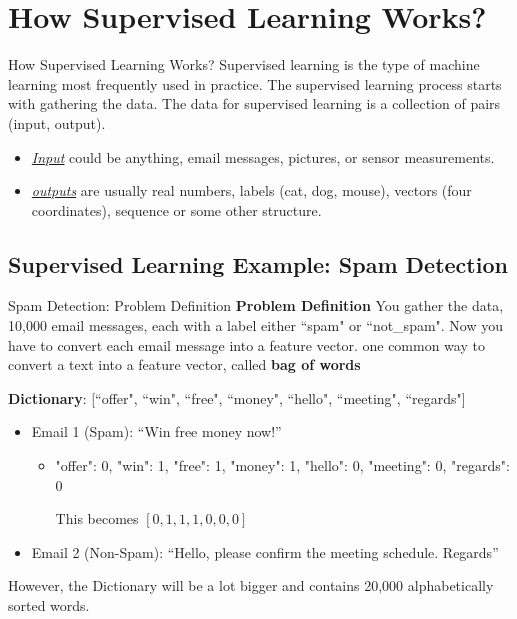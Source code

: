 \documentclass[10pt,dvipsnames]{beamer}
\newcommand{\cb}[1]{{\color{CadetBlue}#1}}
\begin{document}
\section{How Supervised Learning Works?}
\begin{frame}{How Supervised Learning Works?}
    Supervised learning is the type of machine learning most frequently used in practice. The supervised learning process starts with gathering the data. The data for supervised learning is a collection of pairs (input, output).
    \begin{itemize}
        \item \underline{\textit{Input}} could be anything, email messages, pictures, or sensor measurements.
        \item \underline{\textit{outputs}} are usually real numbers, labels (cat, dog, mouse), vectors (four coordinates), sequence or some other structure.
    \end{itemize}
\end{frame}

\subsection{Supervised Learning Example: Spam Detection}
\begin{frame}{Spam Detection: Problem Definition}
    \cb{\textbf{Problem Definition}} You gather the data, 10,000 email messages, each with a label either ``spam" or ``not\_spam". Now you have to convert each email message into a feature vector. one common way to convert a text into a feature vector, called \textbf{bag of words}
    \begin{tcolorbox}[enhanced jigsaw, breakable, pad at break*=1mm, colback=gray!20!white, colframe=black!85!black, title=\textbf{Bag of Words}]
        \textbf{Dictionary}: [``offer", ``win", ``free", ``money", ``hello", ``meeting", ``regards"]
        \begin{itemize}
            \item Email 1 (Spam): ``Win free money now!''
                  \begin{itemize}
                      \item "offer": 0, "win": 1, "free": 1, "money": 1, "hello": 0, "meeting": 0, "regards": 0

                            This becomes \([0,1,1,1,0,0,0]\)
                  \end{itemize}
            \item Email 2 (Non-Spam): ``Hello, please confirm the meeting schedule. Regards''
        \end{itemize}
    \end{tcolorbox}
    However, the Dictionary will be a lot bigger and contains 20,000 alphabetically sorted words.
\end{frame}
\end{document}
